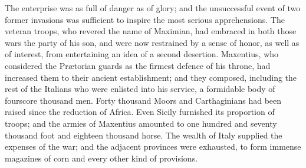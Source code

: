 


The enterprise was as full of danger as of glory; and the
unsuccessful event of two former invasions was sufficient to
inspire the most serious apprehensions. The veteran troops, who
revered the name of Maximian, had embraced in both those wars the
party of his son, and were now restrained by a sense of honor, as
well as of interest, from entertaining an idea of a second
desertion. Maxentius, who considered the Prætorian guards as the
firmest defence of his throne, had increased them to their
ancient establishment; and they composed, including the rest of
the Italians who were enlisted into his service, a formidable
body of fourscore thousand men. Forty thousand Moors and
Carthaginians had been raised since the reduction of Africa. Even
Sicily furnished its proportion of troops; and the armies of
Maxentius amounted to one hundred and seventy thousand foot and
eighteen thousand horse. The wealth of Italy supplied the
expenses of the war; and the adjacent provinces were exhausted,
to form immense magazines of corn and every other kind of
provisions.

